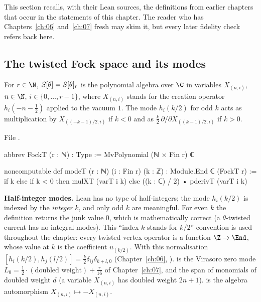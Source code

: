 This section recalls, with their Lean sources, the definitions from earlier chapters that occur
in the statements of this chapter.  The reader who has Chapters~\ref{ch:06} and~\ref{ch:07} fresh
may skim it, but every later fidelity check refers back here.

\subsection{The twisted Fock space and its modes}
\begin{definition}\label{ch08:def:FockT}
For $r\in\N$, $S[\theta]=S[\theta]_r$ is the polynomial algebra over $\C$ in variables
$X_{(n,i)}$, $n\in\N$, $i\in\{0,\dots,r-1\}$, where $X_{(n,i)}$ stands for the creation operator
$h_i(-n-\tfrac12)$ applied to the vacuum $1$.  The mode $h_i(k/2)$ for odd $k$ acts as
multiplication by $X_{((-k-1)/2,i)}$ if $k<0$ and as $\tfrac k2\,\partial/\partial X_{((k-1)/2,i)}$
if $k>0$.
\end{definition}
\noindent File .
\begin{leancode}
abbrev FockT (r : ℕ) : Type := MvPolynomial (ℕ × Fin r) ℂ

noncomputable def modeT (r : ℕ) (i : Fin r) (k : ℤ) : Module.End ℂ (FockT r) :=
  if k %
  else if k < 0 then mulXT (varT i k)
  else ((k : ℂ) / 2) • pderivT (varT i k)
\end{leancode}
\begin{dictionary}
\textbf{Half-integer modes.} Lean has no type of half-integers; the mode $h_i(k/2)$ is indexed by
the \emph{integer} $k$, and only odd $k$ are meaningful.  For even $k$ the definition returns the
junk value $0$, which is mathematically correct (a $\theta$-twisted current has no integral
modes).  This ``index $k$ stands for $k/2$'' convention is used throughout the chapter: every
twisted vertex operator is a function $\Z\to\End$, whose value at $k$ is the coefficient
$u_{(k/2)}$.  With this normalisation $[h_i(k/2),h_j(l/2)]=\tfrac k2\delta_{ij}\delta_{k+l,0}$
(Chapter~\ref{ch:06}, ).   is the Virasoro zero mode
$L_0=\frac12\cdot(\text{doubled weight})+\frac r{16}$ of Chapter~\ref{ch:07}, and
 the span of monomials of doubled weight $d$ (a variable $X_{(n,i)}$ has doubled
weight $2n+1$).   is the algebra automorphism $X_{(n,i)}\mapsto -X_{(n,i)}$.
\end{dictionary}

